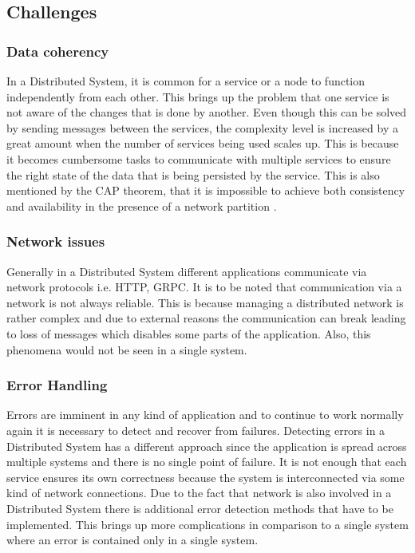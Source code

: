     \subsection{Challenges}    
        \label{subsection: distriChallenges}
        \subsubsection{Data coherency}
        In a Distributed System, it is common for a service or a node to function independently from each other. This brings up the problem that
        one service is not aware of the changes that is done by another. Even though this can be solved by sending messages between the services, the complexity
        level is increased by a great amount when the number of services being used scales up. This is because it becomes cumbersome tasks to communicate with
        multiple services to ensure the right state of the data that is being persisted by the service. This is also mentioned by the CAP theorem, that it is
        impossible to achieve both consistency and availability in the presence of a network partition \cite[p.~59]{CAP}.

        \subsubsection{Network issues}
        Generally in a Distributed System different applications communicate via network protocols i.e. HTTP, GRPC. It is to be noted that
        communication via a network is not always reliable. This is because managing a distributed network is rather complex and due to
        external reasons the communication can break leading to loss of messages which disables some parts of the application. 
        Also, this phenomena would not be seen in a single system.

        \subsubsection{Error Handling}
        Errors are imminent in any kind of application and to continue to work normally again it is necessary to detect and recover from failures.
        Detecting errors in a Distributed System has a different approach since the application is spread across multiple systems and there is no 
        single point of failure. It is not enough that each service ensures its own correctness because the system is interconnected via some kind of
        network connections. Due to the fact that network is also involved in a Distributed System there is additional error detection methods that have
        to be implemented. This brings up more complications in comparison to a single system where an error is contained only in a single system.

         
